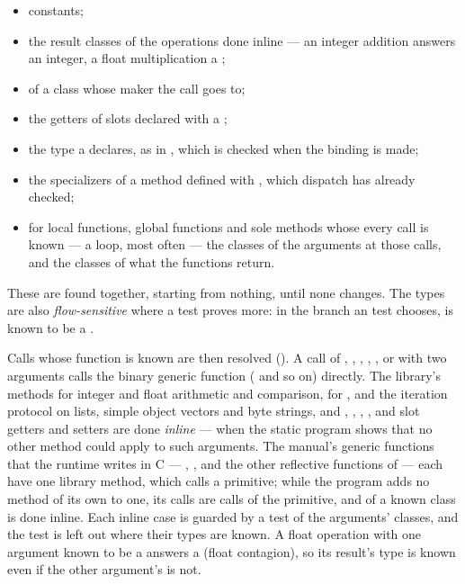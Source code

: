 \begin{itemize}
\item constants;
\item the result classes of the operations done inline --- an integer
  addition answers an integer, a float multiplication a
  ;
\item {} of a class whose maker the call goes to;
\item the getters of slots declared with a ;
\item the type a  declares, as in
  , which is checked when
  the binding is made;
\item the specializers of a method defined with ,
  which dispatch has already checked;
\item for local functions, global functions and sole methods whose every
  call is known --- a loop, most often --- the classes of the arguments
  at those calls, and the classes of what the functions return.
\end{itemize}

These are found together, starting from nothing, until none changes.
The types are also \emph{flow-sensitive} where a test proves more: in
the branch an  test chooses,  is known to
be a .

Calls whose function is known are then resolved (). A
call of \code{+}, \code{-}, \code{*}, \code{/}, \code{<}, \code{>} or
\code{=} with two arguments calls the binary generic function
( and so on) directly. The library's methods for integer
and float arithmetic and comparison, for , 
and the iteration protocol on lists, simple object vectors and byte
strings, and , , , ,
 and slot getters and setters are done \emph{inline} ---
when the static program shows that no other method could apply to such
arguments. The manual's generic functions that the runtime writes in C
--- , ,  and the
other reflective functions of  --- each
have one library method, which calls a \code{\%} primitive; while the
program adds no method of its own to one, its calls are calls of the
primitive, and  of a known class is done inline. Each inline case is guarded by a test of the arguments' classes,
and the test is left out where their types are known. A float
operation with one argument known to be a  answers a
 (float contagion), so its result's type is known
even if the other argument's is not.

